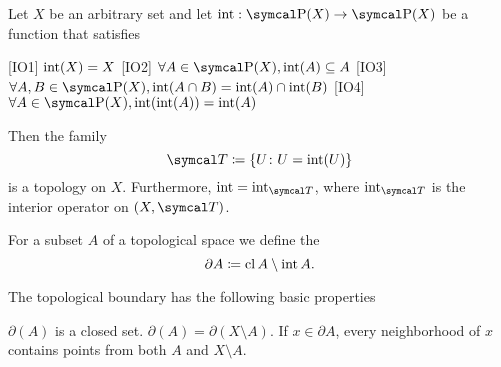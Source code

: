 \begin{proposition}\label{thm:interior_operator_axioms}
  Let \( X \) be an arbitrary set and let \( \Int: \Power(X) \to \Power(X) \) be a function that satisfies
  \begin{description}
    [IO1] \( \operatorname{int}(X) = X \)
    [IO2] \( \forall A \in \Power(X), \Int(A) \subseteq A \)
    [IO3] \( \forall A, B \in \Power(X), \Int(A \cap B) = \Int(A) \cap \Int(B) \)
    [IO4] \( \forall A \in \Power(X), \Int(\Int(A)) = \Int(A) \)
  \end{description}

  Then the family
  \begin{equation*}
    \Cal{T} \coloneqq \{ U \colon U = \Int(U) \}
  \end{equation*}
  is a topology on \( X \). Furthermore, \( \Int = \Int_{\Cal{T}} \), where \( \Int_{\Cal{T}} \) is the interior operator on \( (X, \Cal{T}) \).
\end{proposition}

\begin{definition}\label{def:topological_boundary}\cite[24]{Engelking1989}
  For a subset \( A \) of a topological space we define the 
  \begin{equation*}
    \partial A \coloneqq \operatorname{cl}{A} \setminus \operatorname{int}{A}.
  \end{equation*}
\end{definition}

\begin{proposition}\label{thm:topological_boundary_properties}
  The topological boundary has the following basic properties
  \begin{thmenum}
     \( \partial(A) \) is a closed set.
     \( \partial(A) = \partial(X \setminus A) \).
     If \( x \in \partial A \), every neighborhood of \( x \) contains points from both \( A \) and \( X \setminus A \).
  \end{thmenum}
\end{proposition}

